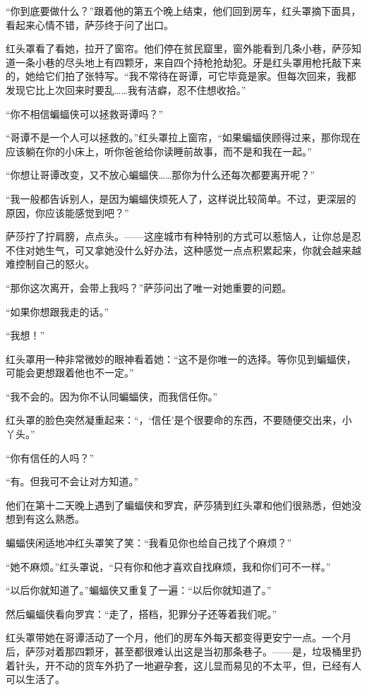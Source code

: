 \documentclass[../main]{subfiles}
\begin{document}
“你到底要做什么？”跟着他的第五个晚上结束，他们回到房车，红头罩摘下面具，看起来心情不错，萨莎终于问了出口。

红头罩看了看她，拉开了窗帘。他们停在贫民窟里，窗外能看到几条小巷，萨莎知道一条小巷的尽头地上有四颗牙，来自四个持枪抢劫犯。牙是红头罩用枪托敲下来的，她给它们拍了张特写。“我不常待在哥谭，可它毕竟是家。但每次回来，我都发现它比上次回来时要乱……我有洁癖，忍不住想收拾。”

“你不相信蝙蝠侠可以拯救哥谭吗？”

“哥谭不是一个人可以拯救的。”红头罩拉上窗帘，“如果蝙蝠侠顾得过来，那你现在应该躺在你的小床上，听你爸爸给你读睡前故事，而不是和我在一起。”

“你想让哥谭改变，又不放心蝙蝠侠……那你为什么还每次都要离开呢？”

“我一般都告诉别人，是因为蝙蝠侠烦死人了，这样说比较简单。不过，更深层的原因，你应该能感觉到吧？”

萨莎拧了拧肩膀，点点头。——这座城市有种特别的方式可以惹恼人，让你总是忍不住对她生气，可又拿她没什么好办法，这种感觉一点点积累起来，你就会越来越难控制自己的怒火。

“那你这次离开，会带上我吗？”萨莎问出了唯一对她重要的问题。

“如果你想跟我走的话。”

“我想！”

红头罩用一种非常微妙的眼神看着她：“这不是你唯一的选择。等你见到蝙蝠侠，可能会更想跟着他也不一定。”

“我不会的。因为你不认同蝙蝠侠，而我信任你。”

红头罩的脸色突然凝重起来：“，‘信任’是个很要命的东西，不要随便交出来，小丫头。”

“你有信任的人吗？”

“有。但我可不会让对方知道。”

他们在第十二天晚上遇到了蝙蝠侠和罗宾，萨莎猜到红头罩和他们很熟悉，但她没想到有这么熟悉。

蝙蝠侠闲适地冲红头罩笑了笑：“我看见你也给自己找了个麻烦？”

“她不麻烦。”红头罩说，“只有你和他才喜欢自找麻烦，我和你们可不一样。”

“以后你就知道了。”蝙蝠侠又重复了一遍：“以后你就知道了。”

然后蝙蝠侠看向罗宾：“走了，搭档，犯罪分子还等着我们呢。”

红头罩带她在哥谭活动了一个月，他们的房车外每天都变得更安宁一点。一个月后，萨莎对着那四颗牙，甚至都很难认出这是当初那条巷子。——是，垃圾桶里扔着针头，开不动的货车外扔了一地避孕套，这儿显而易见的不太平，但，已经有人可以生活了。
\end{document}
